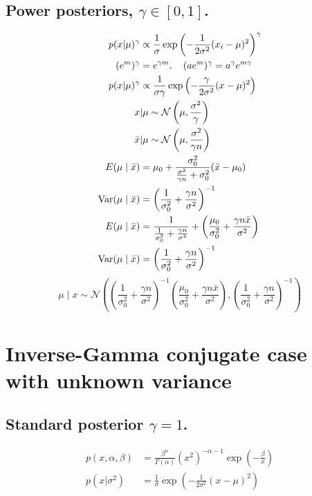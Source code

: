 \documentclass[12pt]{article}
\begin{document}
\begin{appendices}
\subsection{Power posteriors, $\gamma \in [0,1]$.}
\begin{equation*}
\begin{aligned}
  p(x|\mu)^\gamma&\propto \frac{1}{\sigma}\exp\left(-\frac{1}{2\sigma^2}(x_i-\mu)^2\right)^\gamma\\
    (e^m)^\gamma &= e^{\gamma\relax m}, \quad (ae^m)^\gamma = a^{\gamma}e^{m\gamma}\\
p(x|\mu)^\gamma&\propto \frac{1}{\sigma\gamma}\exp\left(-\frac{\gamma}{2\sigma^2}(x-\mu)^2\right)\\
 x &|\mu \sim \mathcal{N}\left(\mu,\frac{\sigma^2}{\gamma}\right)\\
\bar{x} &|\mu \sim \mathcal{N}\left(\mu,\frac{\sigma^2}{\gamma\relax n}\right)\\
    E(\mu \mid \bar{x}) &= \mu_0 + \frac{\sigma_0^2}{\frac{\sigma^2}{\gamma \relax n} + \sigma_0^2}(\bar{x} - \mu_0) \\ 
    \text{Var}(\mu \mid \bar{x})&= \left( \frac{1}{\sigma_0^2} + \frac{\gamma\relax n}{\sigma^2} \right)^{-1} \\
       E(\mu \mid \bar{x}) &= \frac{1}{\frac{1}{\sigma_0^2} + \frac{\gamma n}{\sigma^2}} 
    + \left( \frac{\mu_0}{\sigma_0^2} + \frac{\gamma n \bar{x}}{\sigma^2} \right)\\
    \text{Var}(\mu \mid \bar{x})&= \left( \frac{1}{\sigma_0^2} + \frac{\gamma\relax n}{\sigma^2} \right)^{-1} \\
    \end{aligned}
\end{equation*}
\begin{equation}
\mu \;|\; x \sim \mathcal{N} \left( \left( \frac{1}{\sigma_0^2} + \frac{\gamma n}{\sigma^2} \right)^{-1} \left(\frac{\mu_0}{\sigma_0^2} + \frac{\gamma n \bar{x}}{\sigma^2}  \right), \left( \frac{1}{\sigma_0^2} + \frac{\gamma n}{\sigma^2} \right)^{-1} \right)
\end{equation}

\section{Inverse-Gamma conjugate case with unknown variance}
\subsection{Standard posterior  $\gamma = 1$.}
\begin{equation*}
\begin{aligned}
    p(x, \alpha,\beta) &= \frac{\beta^\alpha}{\Gamma(\alpha)} (x^2)^{-\alpha - 1} \exp\left(-\frac{\beta}{x}\right)\\
p(x|\sigma^2) &= \frac{1}{\sigma} \exp\left(-\frac{1}{2\sigma^2} (x - \mu)^2 \right)
    \end{aligned}
\end{equation*}


\end{appendices}
\end{document}
